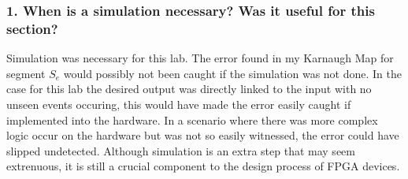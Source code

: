 \documentclass{article}
\begin{document}
\subsubsection*{\textcolor{mycolor}{1. When is a simulation necessary? Was it useful for this section?}}
Simulation was necessary for this lab. The error found in my Karnaugh Map for segment $S_e$ would possibly not been caught if the simulation was not done. In the case for this lab the desired output was directly linked to the input with no unseen events occuring, this would have made the error easily caught if implemented into the hardware. In a scenario where there was more complex logic occur on the hardware but was not so easily witnessed, the error could have slipped undetected. Although simulation is an extra step that may seem extrenuous, it is still a crucial component to the design process of FPGA devices.

\newpage
\end{document}
